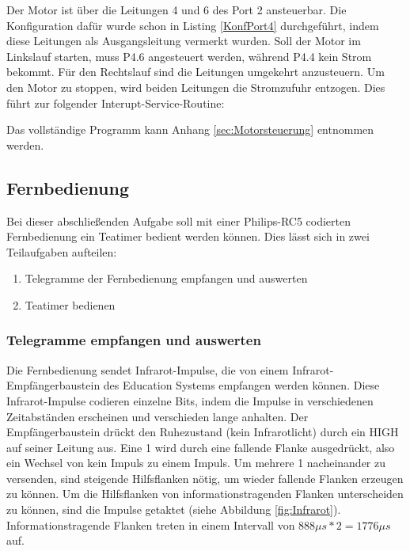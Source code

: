 \documentclass[12pt,a4paper,bibliography=totocnumbered,listof=totocnumbered]{scrartcl}
\begin{document}
Der Motor ist über die Leitungen 4 und 6 des Port 2 ansteuerbar. Die Konfiguration dafür wurde schon in Listing \ref{KonfPort4} durchgeführt, indem diese Leitungen als Ausgangsleitung vermerkt wurden.
Soll der Motor im Linkslauf starten, muss P4.6 angesteuert werden, während P4.4 kein Strom bekommt. Für den Rechtslauf sind die Leitungen umgekehrt anzusteuern. Um den Motor zu stoppen, wird beiden Leitungen die Stromzufuhr entzogen. Dies führt zur folgender Interupt-Service-Routine:

\vspace{1em}


Das vollständige Programm kann Anhang \ref{sec:Motorsteuerung} entnommen werden.

\pagebreak

\subsection{Fernbedienung}
Bei dieser abschließenden Aufgabe soll mit einer Philips-RC5 codierten Fernbedienung ein Teatimer bedient werden können. Dies lässt sich in zwei Teilaufgaben aufteilen:
\begin{enumerate}
	\item Telegramme der Fernbedienung empfangen und auswerten
	\item Teatimer bedienen
\end{enumerate}

\subsubsection{Telegramme empfangen und auswerten}
Die Fernbedienung sendet Infrarot-Impulse, die von einem Infrarot-Empfängerbaustein des Education Systems empfangen werden können. Diese Infrarot-Impulse codieren einzelne Bits, indem die Impulse in verschiedenen Zeitabständen erscheinen und verschieden lange anhalten. Der Empfängerbaustein drückt den Ruhezustand (kein Infrarotlicht) durch ein HIGH auf seiner Leitung aus. Eine 1 wird durch eine fallende Flanke ausgedrückt, also ein Wechsel von kein Impuls zu einem Impuls. Um mehrere 1 nacheinander zu versenden, sind steigende Hilfsflanken nötig, um wieder fallende Flanken erzeugen zu können. Um die Hilfsflanken von informationstragenden Flanken unterscheiden zu können, sind die Impulse getaktet (siehe Abbildung \ref{fig:Infrarot}). Informationstragende Flanken treten in einem Intervall von \(888{\mu}s*2=1776{\mu}s\) auf.
\end{document}
